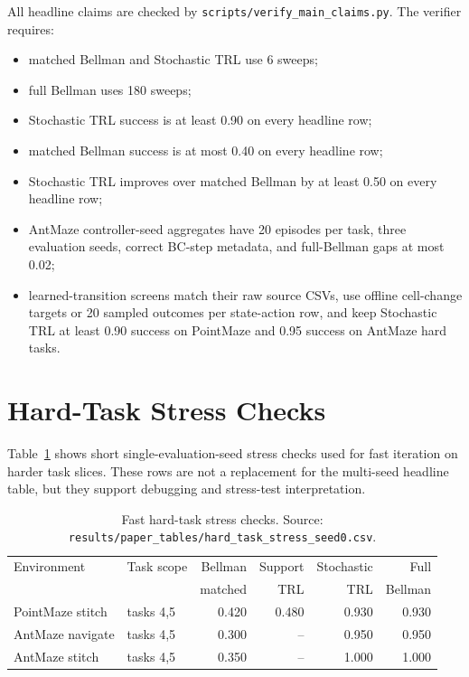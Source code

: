 \documentclass[10pt]{article}
\begin{document}
All headline claims are checked by
\texttt{scripts/verify\_main\_claims.py}. The verifier requires:
\begin{itemize}[leftmargin=1.5em]
    \item matched Bellman and Stochastic TRL use 6 sweeps;
    \item full Bellman uses 180 sweeps;
    \item Stochastic TRL success is at least 0.90 on every headline row;
    \item matched Bellman success is at most 0.40 on every headline row;
    \item Stochastic TRL improves over matched Bellman by at least 0.50 on
    every headline row;
    \item AntMaze controller-seed aggregates have 20 episodes per task, three
    evaluation seeds, correct BC-step metadata, and full-Bellman gaps at most
    0.02;
    \item learned-transition screens match their raw source CSVs, use offline
    cell-change targets or 20 sampled outcomes per state-action row, and keep
    Stochastic TRL at least 0.90 success on PointMaze and 0.95 success on
    AntMaze hard tasks.
\end{itemize}

\section{Hard-Task Stress Checks}

Table~\ref{tab:stress} shows short single-evaluation-seed stress checks used
for fast iteration on harder task slices. These rows are not a replacement for
the multi-seed headline table, but they support debugging and stress-test
interpretation.

\begin{table}[h]
\centering
\caption{Fast hard-task stress checks. Source:
\texttt{results/paper\_tables/hard\_task\_stress\_seed0.csv}.}
\label{tab:stress}
\begin{tabular}{llrrrr}
\toprule
Environment & Task scope & Bellman & Support & Stochastic & Full\\
 & & matched & TRL & TRL & Bellman\\
\midrule
PointMaze stitch & tasks 4,5 & 0.420 & 0.480 & 0.930 & 0.930\\
AntMaze navigate & tasks 4,5 & 0.300 & -- & 0.950 & 0.950\\
AntMaze stitch & tasks 4,5 & 0.350 & -- & 1.000 & 1.000\\
\bottomrule
\end{tabular}
\end{table}
\end{document}
